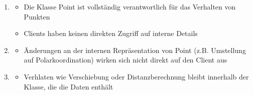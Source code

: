 \begin{infoBox}[title=Vorteile der verbesserten Kapselung]
    \begin{enumerate}
        \item {}
        \begin{itemize}
            \item Die Klasse Point ist vollständig verantwortlich für das Verhalten von Punkten
            \item Clients haben keinen direkten Zugriff auf interne Details
        \end{itemize}
        \item {}
        \begin{itemize}
            \item Änderungen an der internen Repräsentation von Point (z.B. Umstellung auf Polarkoordination) wirken sich nicht direkt auf den Client aus
        \end{itemize}
        \item {}
        \begin{itemize}
            \item Verhlaten wie Verschiebung oder Distanzberechnung bleibt innerhalb der Klasse, die die Daten enthält
        \end{itemize}
    \end{enumerate}
\end{infoBox}
